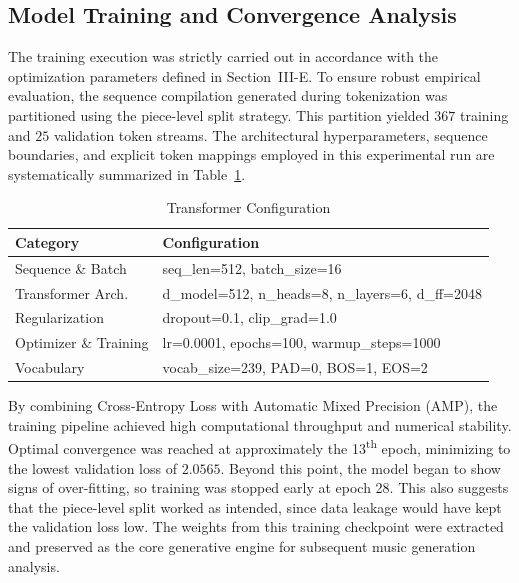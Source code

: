 \documentclass[conference,a4paper]{IEEEtran}
\begin{document}
\subsection{Model Training and Convergence Analysis}
The training execution was strictly carried out in accordance with the optimization parameters defined in Section~III-E. To ensure robust empirical evaluation, the sequence compilation generated during tokenization was partitioned using the piece-level split strategy. This partition yielded $367$ training and $25$ validation token streams. The architectural hyperparameters, sequence boundaries, and explicit token mappings employed in this experimental run are systematically summarized in Table~\ref{tab:transformer_config}.

\begin{table}[htbp]
\centering
\footnotesize
\setlength{\tabcolsep}{4pt}
\caption{Transformer Configuration}
\label{tab:transformer_config}
\begin{tabular}{l|l}
\hline
\textbf{Category} & \textbf{Configuration} \\
\hline
Sequence \& Batch & seq\_len=512, batch\_size=16 \\
Transformer Arch. & d\_model=512, n\_heads=8, n\_layers=6, d\_ff=2048 \\
Regularization    & dropout=0.1, clip\_grad=1.0 \\
Optimizer \& Training & lr=0.0001, epochs=100, warmup\_steps=1000 \\
Vocabulary        & vocab\_size=239, PAD=0, BOS=1, EOS=2 \\
\hline
\end{tabular}
\end{table}

By combining Cross-Entropy Loss with Automatic Mixed Precision (AMP), the training pipeline achieved high computational throughput and numerical stability. Optimal convergence was reached at approximately the 13\textsuperscript{th} epoch, minimizing to the lowest validation loss of 
$2.0565$. Beyond this point, the model began to show signs of over-fitting, so training was stopped early at epoch 28. This also suggests that the piece-level split worked as intended, since data leakage would have kept the validation loss low. The weights from this training checkpoint were extracted and preserved as the core generative engine for subsequent music generation analysis.
\end{document}
